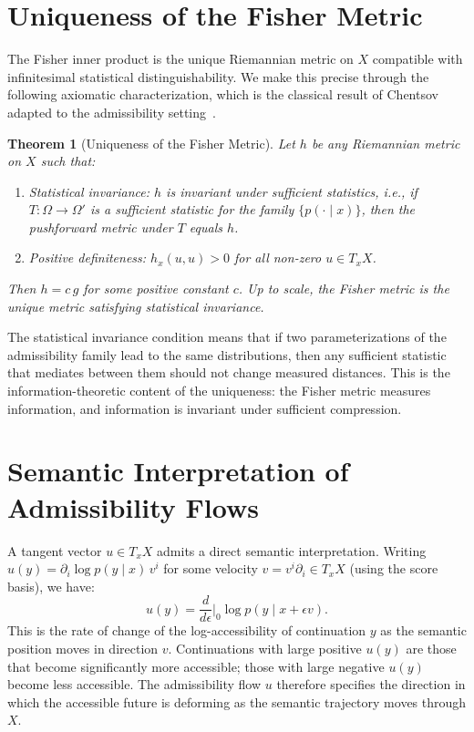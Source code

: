 \documentclass[12pt, oneside]{book}
\theoremstyle{plain-flyxion}
\newtheorem{theorem}{Theorem}[chapter]
\theoremstyle{definition-flyxion}
\begin{document}
\section{Uniqueness of the Fisher Metric}

The Fisher inner product is the unique Riemannian metric on $X$ compatible with
infinitesimal statistical distinguishability. We make this precise through the following
axiomatic characterization, which is the classical result of Chentsov adapted to the
admissibility setting~\cite{amari2016information}.

\begin{theorem}[Uniqueness of the Fisher Metric]\label{thm:fisher-unique}
Let $h$ be any Riemannian metric on $X$ such that:
\begin{enumerate}
  \item[(i)] \emph{Statistical invariance}: $h$ is invariant under sufficient statistics,
    i.e., if $T: \Omega \to \Omega'$ is a sufficient statistic for the family
    $\{p(\cdot\mid x)\}$, then the pushforward metric under $T$ equals $h$.
  \item[(ii)] \emph{Positive definiteness}: $h_x(u,u) > 0$ for all non-zero $u \in T_x X$.
\end{enumerate}
Then $h = c\, g$ for some positive constant $c$. Up to scale, the Fisher metric is the
unique metric satisfying statistical invariance.
\end{theorem}

The statistical invariance condition means that if two parameterizations of the
admissibility family lead to the same distributions, then any sufficient statistic that
mediates between them should not change measured distances. This is the information-theoretic
content of the uniqueness: the Fisher metric measures information, and information is
invariant under sufficient compression.

\section{Semantic Interpretation of Admissibility Flows}

A tangent vector $u \in T_x X$ admits a direct semantic interpretation. Writing $u(y) =
\partial_i \log p(y\mid x)\, v^i$ for some velocity $v = v^i \partial_i \in T_x X$
(using the score basis), we have:
\[
u(y) = \frac{d}{d\epsilon}\bigg|_0 \log p(y \mid x + \epsilon v).
\]
This is the rate of change of the log-accessibility of continuation $y$ as the semantic
position moves in direction $v$. Continuations with large positive $u(y)$ are those that
become significantly more accessible; those with large negative $u(y)$ become less
accessible. The admissibility flow $u$ therefore specifies the direction in which the
accessible future is deforming as the semantic trajectory moves through $X$.
\end{document}
